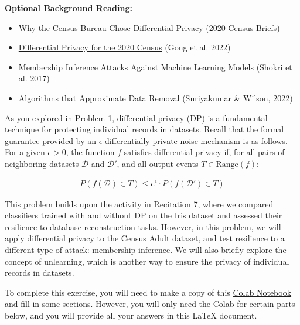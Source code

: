 \documentclass{article}
\begin{document}
\bigskip 
\textbf{Optional Background Reading:}
\begin{itemize}

\item \href{https://www2.census.gov/library/publications/decennial/2020/census-briefs/c2020br-03.pdf}{Why the Census Bureau Chose
Differential Privacy} (2020 Census Briefs)

\item \href{https://privacytools.seas.harvard.edu/blog/differential-privacy-2020-census-how-can-we-make-data-both-private-and-useful}{Differential Privacy for the 2020 Census} (Gong et al. 2022)

\item \href{https://arxiv.org/pdf/1610.05820}{Membership Inference Attacks Against Machine Learning Models} (Shokri et al. 2017)

\item \href{https://arxiv.org/pdf/2209.12269}{Algorithms that Approximate Data Removal} (Suriyakumar \& Wilson, 2022)

\end{itemize}
\bigskip 

As you explored in Problem 1, differential privacy (DP) is a fundamental technique for protecting individual records in datasets.  Recall that the formal guarantee provided by an $\epsilon$-differentially private noise mechanism is as follows. For a given $\epsilon>0$, the function $f$ satisfies differential privacy if, for all pairs of neighboring datasets $\mathcal{D}$ and $\mathcal{D}'$, and all output events $T \in \text{Range}(f)$:

\begin{align*}
    P(f(\mathcal{D}) \in T) \leq e^{\epsilon} \cdot P(f(\mathcal{D}') \in T)
\end{align*}

This problem builds upon the activity in Recitation 7, where we compared classifiers trained with and without DP on the Iris dataset and assessed their resilience to database reconstruction tasks. However, in this problem, we will apply differential privacy to the \href{https://archive.ics.uci.edu/dataset/2/adult}{Census Adult dataset}, and test resilience to a different type of attack: membership inference. We will also briefly explore the concept of unlearning, which is another way to ensure the privacy of individual records in datasets. 

To complete this exercise, you will need to make a copy of this \href{https://colab.research.google.com/drive/1Q1TWMmQLQb0pmez9p5RFQHJtJKEwBeuM?usp=sharing}{Colab Notebook} and fill in some sections. However, you will only need the Colab for certain parts below, and you will provide all your answers in this LaTeX document.
\end{document}
